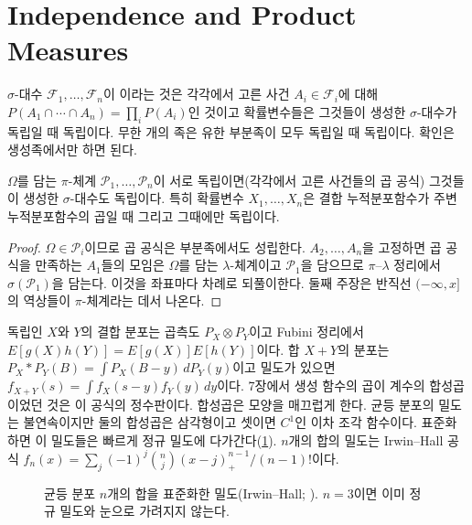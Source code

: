 \section{Independence and Product Measures}
\label{sec:independence}

$\sigma$-대수 $\mathcal F_1,\dots,\mathcal F_n$이 이라는 것은 각각에서 고른 사건 $A_i\in\mathcal F_i$에 대해 $P(A_1\cap\cdots\cap A_n)=\prod_iP(A_i)$인 것이고 확률변수들은 그것들이 생성한 $\sigma$-대수가 독립일 때 독립이다. 무한 개의 족은 유한 부분족이 모두 독립일 때 독립이다. 확인은 생성족에서만 하면 된다.

\begin{proposition}
\label{prop:independence-pi}
$\Omega$를 담는 $\pi$-체계 $\mathcal P_1,\dots,\mathcal P_n$이 서로 독립이면(각각에서 고른 사건들의 곱 공식) 그것들이 생성한 $\sigma$-대수도 독립이다. 특히 확률변수 $X_1,\dots,X_n$은 결합 누적분포함수가 주변 누적분포함수의 곱일 때 그리고 그때에만 독립이다.
\end{proposition}

\begin{proof}
$\Omega\in\mathcal P_i$이므로 곱 공식은 부분족에서도 성립한다. $A_2,\dots,A_n$을 고정하면 곱 공식을 만족하는 $A_1$들의 모임은 $\Omega$를 담는 $\lambda$-체계이고 $\mathcal P_1$을 담으므로 $\pi$--$\lambda$ 정리에서 $\sigma(\mathcal P_1)$을 담는다. 이것을 좌표마다 차례로 되풀이한다. 둘째 주장은 반직선 $(-\infty,x]$의 역상들이 $\pi$-체계라는 데서 나온다.
\end{proof}

독립인 $X$와 $Y$의 결합 분포는 곱측도 $P_X\otimes P_Y$이고 Fubini 정리에서 $E[g(X)h(Y)]=E[g(X)]E[h(Y)]$이다. 합 $X+Y$의 분포는  $P_X\ast P_Y(B)=\int P_X(B-y)\,dP_Y(y)$이고 밀도가 있으면 $f_{X+Y}(s)=\int f_X(s-y)f_Y(y)\,dy$이다. 7장에서 생성 함수의 곱이 계수의 합성곱이었던 것은 이 공식의 정수판이다. 합성곱은 모양을 매끄럽게 한다. 균등 분포의 밀도는 불연속이지만 둘의 합성곱은 삼각형이고 셋이면 $C^1$인 이차 조각 함수이다. 표준화하면 이 밀도들은 빠르게 정규 밀도에 다가간다(\cref{fig:irwin}). $n$개의 합의 밀도는 Irwin--Hall 공식 $f_n(x)=\sum_j(-1)^j\binom nj(x-j)_+^{n-1}/(n-1)!$이다.

\begin{figure}[htbp]
\centering
{}
\caption{균등 분포 $n$개의 합을 표준화한 밀도(Irwin--Hall; ). $n=3$이면 이미 정규 밀도와 눈으로 가려지지 않는다.}
\label{fig:irwin}
\end{figure}

